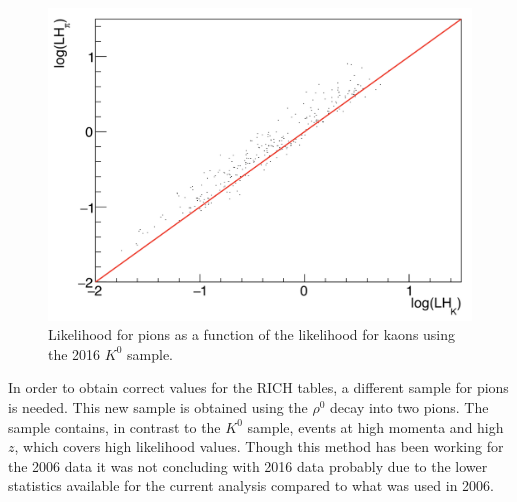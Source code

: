 \begin{figure}[!h]
  \centering
	\includegraphics[scale=0.4]{./gfx/K0sample.png}
	\caption{Likelihood for pions as a function of the likelihood for kaons using the 2016 $K^0$ sample.}
	\label{pic:K0sample}
\end{figure}

In order to obtain correct values for the RICH tables, a different sample for pions is needed. This new sample is obtained using the $\rho^0$ decay into two pions. The sample contains, in contrast to the $K^0$ sample, events at high momenta and high $z$, which covers high likelihood values. Though this method has been working for the 2006 data it was not concluding with 2016 data probably due to the lower statistics available for the current analysis compared to what was used in 2006.


